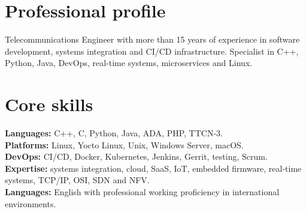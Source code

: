 \documentclass[10pt,a4paper]{article}
\begin{document}
\ATSSetup
{}

\section{Professional profile}
Telecommunications Engineer with more than 15 years of experience in software development, systems integration and CI/CD infrastructure. Specialist in C++, Python, Java, DevOps, real-time systems, microservices and Linux.

\section{Core skills}
\textbf{Languages:} C++, C, Python, Java, ADA, PHP, TTCN-3.\\
\textbf{Platforms:} Linux, Yocto Linux, Unix, Windows Server, macOS.\\
\textbf{DevOps:} CI/CD, Docker, Kubernetes, Jenkins, Gerrit, testing, Scrum.\\
\textbf{Expertise:} systems integration, cloud, SaaS, IoT, embedded firmware, real-time systems, TCP/IP, OSI, SDN and NFV.\\
\textbf{Languages:} English with professional working proficiency in international environments.
\end{document}
